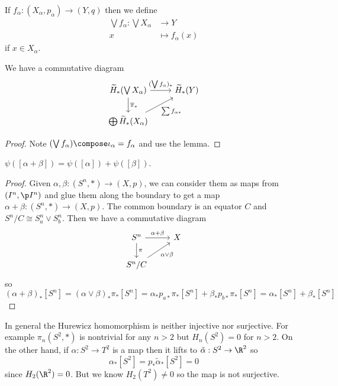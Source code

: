 \documentclass[a4paper]{article}
\renewcommand{\b}{\p}
\begin{document}
If \(f_\alpha: (X_\alpha, p_\alpha) \to (Y, q)\) then we define
\begin{align*}
  \bigvee f_\alpha: \bigvee X_\alpha &\to Y \\
  x &\mapsto f_\alpha(x)
\end{align*}
if \(x \in X_\alpha\).

\begin{corollary}
  We have a commutative diagram
  \[
    \begin{tikzcd}
      \widetilde H_*(\bigvee X_\alpha) \ar[r, "(\bigvee f_\alpha)_*"] \ar[d, "\overline \pi_*"] & \widetilde H_*(Y) \\
      \bigoplus \widetilde H_*(X_\alpha) \ar[ur, "\sum f_{\alpha *}"']
    \end{tikzcd}
  \]
\end{corollary}

\begin{proof}
  Note \((\bigvee f_\alpha) \compose \iota_\alpha = f_\alpha\) and use the lemma.
\end{proof}


\begin{proposition}
  \(\psi([\alpha + \beta]) = \psi([\alpha]) + \psi([\beta])\).
\end{proposition}

\begin{proof}
  Given \(\alpha, \beta: (S^n, *) \to (X, p)\), we can consider them as maps from \((I^n, \b I^n)\) and glue them along the boundary to get a map \(\alpha + \beta: (S^n, *) \to (X, p)\). The common boundary is an equator \(C\) and \(S^n/C \cong S^n_a \vee S^n_b\). Then we have a commutative diagram
  \[
    \begin{tikzcd}
      S^n \ar[r, "\alpha + \beta"] \ar[d, "\pi"] & X \\
      S^n/C \ar[ur, "\alpha \vee \beta"']
    \end{tikzcd}
  \]
  so
  \[
    (\alpha + \beta)_* [S^n]
    = (\alpha \vee \beta)_* \pi_* [S^n]
    = \alpha_* p_{a*} \pi_* [S^n] + \beta_* p_{b*} \pi_* [S^n]
    = \alpha_* [S^n] + \beta_* [S^n]
  \]
\end{proof}

In general the Hurewicz homomorphism is neither injective nor surjective. For example \(\pi_n(S^2, *)\) is nontrivial for any \(n > 2\) but \(H_n(S^2) = 0\) for \(n > 2\). On the other hand, if \(\alpha: S^2 \to T^2\) is a map then it lifts to \(\tilde \alpha: S^2 \to \R^2\) so
\[
  \alpha_*[S^2] = p_* \tilde \alpha_*[S^2] = 0
\]
since \(H_2(\R^2) = 0\). But we know \(H_2(T^2) \neq 0\) so the map is not surjective.
\end{document}
